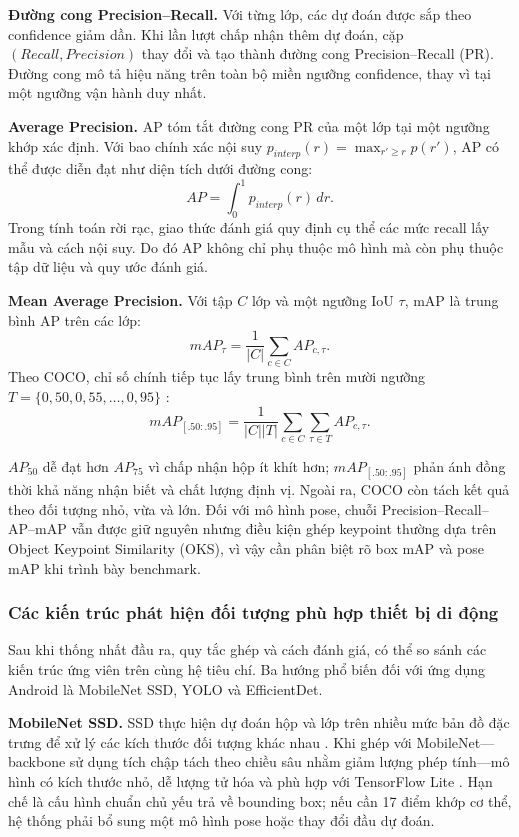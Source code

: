 \textbf{Đường cong Precision--Recall.} Với từng lớp, các dự đoán được sắp theo confidence giảm dần. Khi lần lượt chấp nhận thêm dự đoán, cặp $(Recall,Precision)$ thay đổi và tạo thành đường cong Precision--Recall (PR). Đường cong mô tả hiệu năng trên toàn bộ miền ngưỡng confidence, thay vì tại một ngưỡng vận hành duy nhất.

\textbf{Average Precision.} AP tóm tắt đường cong PR của một lớp tại một ngưỡng khớp xác định. Với bao chính xác nội suy $p_{interp}(r)=\max_{r'\geq r}p(r')$, AP có thể được diễn đạt như diện tích dưới đường cong:
\begin{equation}
AP=\int_0^1 p_{interp}(r)\,dr.
\end{equation}
Trong tính toán rời rạc, giao thức đánh giá quy định cụ thể các mức recall lấy mẫu và cách nội suy. Do đó AP không chỉ phụ thuộc mô hình mà còn phụ thuộc tập dữ liệu và quy ước đánh giá.

\textbf{Mean Average Precision.} Với tập $C$ lớp và một ngưỡng IoU $\tau$, mAP là trung bình AP trên các lớp:
\begin{equation}
mAP_{\tau}=\frac{1}{|C|}\sum_{c\in C}AP_{c,\tau}.
\end{equation}
Theo COCO, chỉ số chính tiếp tục lấy trung bình trên mười ngưỡng $T=\{0{,}50,0{,}55,\ldots,0{,}95\}$ :
\begin{equation}
mAP_{[.50:.95]}=\frac{1}{|C||T|}
\sum_{c\in C}\sum_{\tau\in T}AP_{c,\tau}.
\end{equation}

$AP_{50}$ dễ đạt hơn $AP_{75}$ vì chấp nhận hộp ít khít hơn; $mAP_{[.50:.95]}$ phản ánh đồng thời khả năng nhận biết và chất lượng định vị. Ngoài ra, COCO còn tách kết quả theo đối tượng nhỏ, vừa và lớn. Đối với mô hình pose, chuỗi Precision--Recall--AP--mAP vẫn được giữ nguyên nhưng điều kiện ghép keypoint thường dựa trên Object Keypoint Similarity (OKS), vì vậy cần phân biệt rõ box mAP và pose mAP khi trình bày benchmark.

\subsubsection{Các kiến trúc phát hiện đối tượng phù hợp thiết bị di động}

Sau khi thống nhất đầu ra, quy tắc ghép và cách đánh giá, có thể so sánh các kiến trúc ứng viên trên cùng hệ tiêu chí. Ba hướng phổ biến đối với ứng dụng Android là MobileNet SSD, YOLO và EfficientDet.

\textbf{MobileNet SSD.} SSD thực hiện dự đoán hộp và lớp trên nhiều mức bản đồ đặc trưng để xử lý các kích thước đối tượng khác nhau . Khi ghép với MobileNet---backbone sử dụng tích chập tách theo chiều sâu nhằm giảm lượng phép tính---mô hình có kích thước nhỏ, dễ lượng tử hóa và phù hợp với TensorFlow Lite . Hạn chế là cấu hình chuẩn chủ yếu trả về bounding box; nếu cần 17 điểm khớp cơ thể, hệ thống phải bổ sung một mô hình pose hoặc thay đổi đầu dự đoán.

